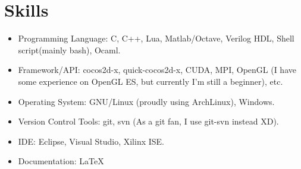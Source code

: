 \documentclass[letterpaper]{article}
\begin{document}
\section*{Skills}
\begin{itemize}
    \item Programming Language: C, C++, Lua, Matlab/Octave, Verilog HDL, Shell script(mainly bash), Ocaml.
    \item Framework/API: cocos2d-x, quick-cocos2d-x, CUDA, MPI, OpenGL (I have some experience on OpenGL ES, but currently I'm still a beginner), etc.
    \item Operating System: GNU/Linux (proudly using ArchLinux), Windows.
    \item Version Control Tools: git, svn (As a git fan, I use git-svn instead XD).
    \item IDE: Eclipse, Visual Studio, Xilinx ISE.
    \item Documentation: \LaTeX
\end{itemize}
\end{document}
